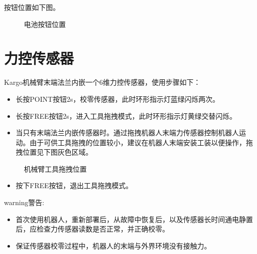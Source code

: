 \documentclass[a4paper,11pt,english,openany,oneside]{sphinxmanual}
\begin{document}
\sphinxAtStartPar
按钮位置如下图。

\begin{figure}[H]
\centering
\capstart

\noindent{}
\caption{电池按钮位置}\label{\detokenize{07 _u6280_u672f_u89c4_u683c:id72}}\end{figure}


\section{力控传感器}
\label{\detokenize{07 _u6280_u672f_u89c4_u683c:id30}}\label{\detokenize{07 _u6280_u672f_u89c4_u683c:id31}}
\sphinxAtStartPar
Kargo机械臂末端法兰内嵌一个6维力控传感器，使用步骤如下：
\begin{itemize}
\item {} 
\sphinxAtStartPar
{} 长按POINT按钮2s，校零传感器，此时环形指示灯蓝绿闪烁两次。

\item {} 
\sphinxAtStartPar
{} 长按FREE按钮2s，进入工具拖拽模式，此时环形指示灯黄绿交替闪烁。

\item {} 
\sphinxAtStartPar
{} 当只有末端法兰内嵌传感器时。通过拖拽机器人末端力传感器控制机器人运动。由于可供工具拖拽的位置较小，建议在机器人末端安装工装以便操作，拖拽位置见下图灰色区域。

\end{itemize}

\begin{figure}[H]
\centering
\capstart

\noindent{}
\caption{机械臂工具拖拽位置}\label{\detokenize{07 _u6280_u672f_u89c4_u683c:id73}}\end{figure}


\begin{itemize}
\item {} 
\sphinxAtStartPar
{} 按下FREE按钮，退出工具拖拽模式。

\end{itemize}

\begin{sphinxadmonition}{warning}{警告:}\begin{itemize}
\item {} 
\sphinxAtStartPar
首次使用机器人，重新部署后，从故障中恢复后，以及传感器长时间通电静置后，应检查力传感器读数是否正常，并正确校零。

\item {} 
\sphinxAtStartPar
保证传感器校零过程中，机器人的末端与外界环境没有接触力。

\end{itemize}
\end{sphinxadmonition}
\end{document}
